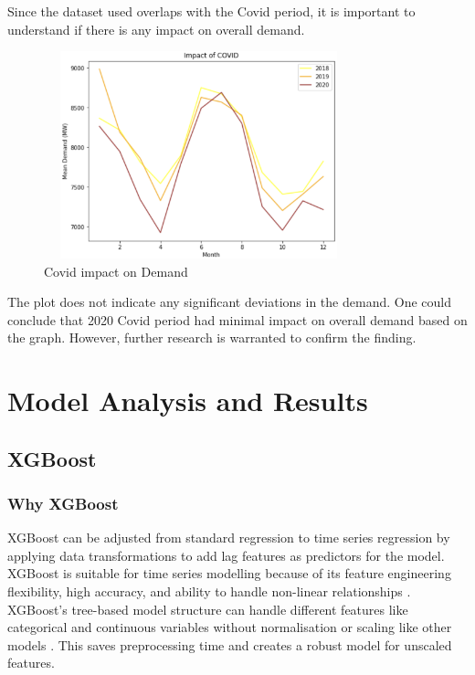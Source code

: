 \documentclass[mstat,12pt]{unswthesis}
\begin{document}
Since the dataset used overlaps with the Covid period, it is important
to understand if there is any impact on overall demand.

\begin{figure}[H]
\centering
\includegraphics[width=0.80\textwidth,height=6cm]{covid_impact.png}
\caption{Covid impact on Demand}
\label{covid_impact}
\end{figure}

The plot does not indicate any significant deviations in the demand. One
could conclude that 2020 Covid period had minimal impact on overall
demand based on the graph. However, further research is warranted to
confirm the finding.

\chapter{Model Analysis and Results}\label{model-analysis-and-results}

\section{XGBoost}\label{xgboost}

\subsection{Why XGBoost}\label{why-xgboost}

XGBoost can be adjusted from standard regression to time series
regression by applying data transformations to add lag features as
predictors for the model. XGBoost is suitable for time series modelling
because of its feature engineering flexibility, high accuracy, and
ability to handle non-linear relationships
\cite{brownlee_gradientboosting2020}. XGBoost's tree-based model
structure can handle different features like categorical and continuous
variables without normalisation or scaling like other models
\cite{ambika_2023_xgboost}. This saves preprocessing time and creates a
robust model for unscaled features.
\end{document}
